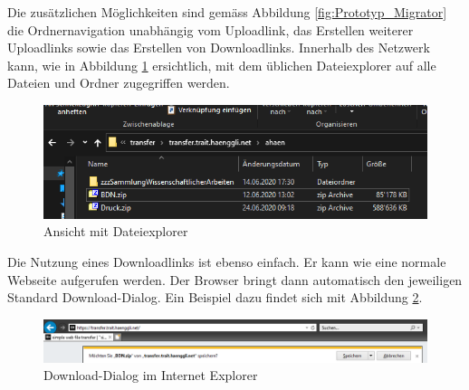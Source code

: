 Die zusätzlichen Möglichkeiten sind gemäss Abbildung \ref{fig:Prototyp_Migrator} 
die Ordnernavigation unabhängig vom Uploadlink, das Erstellen weiterer Uploadlinks 
sowie das Erstellen von Downloadlinks.
Innerhalb des Netzwerk kann, wie in Abbildung \ref{fig:file_explorer} ersichtlich, mit dem üblichen Dateiexplorer auf alle Dateien und Ordner zugegriffen werden.

\begin{figure}[!h]
    \centering
    \includegraphics[width=1\linewidth]{content/images/file_explorer.png}
    \caption{Ansicht mit Dateiexplorer}
    \label{fig:file_explorer}
\end{figure}

Die Nutzung eines Downloadlinks ist ebenso einfach. Er kann wie eine normale Webseite aufgerufen werden.
Der Browser bringt dann automatisch den jeweiligen Standard Download-Dialog. 
Ein Beispiel dazu findet sich mit Abbildung \ref{fig:ie_download}.
\begin{figure}[!h]
    \centering
    \includegraphics[width=1\linewidth]{content/images/prototyp_download.png}
    \caption{Download-Dialog im Internet Explorer}
    \label{fig:ie_download}
\end{figure}

